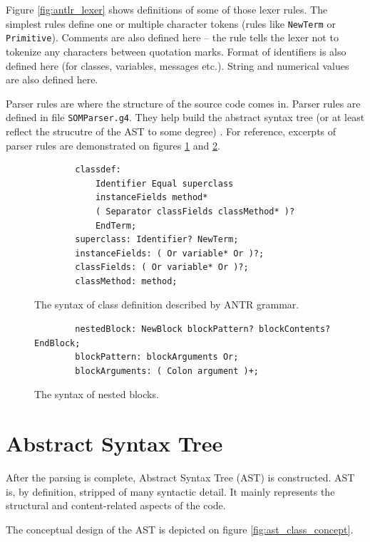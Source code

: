 \documentclass[thesis=M,english]{FITthesis}[2019/12/23]
\begin{document}
Figure \ref{fig:antlr_lexer} shows definitions of some of those lexer rules. The simplest rules define one or multiple character
tokens (rules like \texttt{NewTerm} or \texttt{Primitive}). Comments are also defined here -- the rule tells the lexer not to tokenize
any characters between quotation marks. Format of identifiers is also defined here (for classes, variables, messages etc.). String
and numerical values are also defined here.

Parser rules are where the structure of the source code comes in. Parser rules are defined in file \texttt{SOMParser.g4}. They
help build the abstract syntax tree (or at least reflect the strucutre of the AST to some degree) \cite{antlr-basics}. For reference, excerpts of
parser rules are demonstrated on figures \ref{fig:antlr_classdef} and \ref{fig:antlr_blocks}.

\begin{figure}[h!]
	\centering
	\begin{verbatim}
		classdef:
		    Identifier Equal superclass
		    instanceFields method*
		    ( Separator classFields classMethod* )?
		    EndTerm;
		superclass: Identifier? NewTerm;
		instanceFields: ( Or variable* Or )?;
		classFields: ( Or variable* Or )?;
		classMethod: method;
	\end{verbatim}
	\caption{The syntax of class definition described by ANTR grammar.}
	\label{fig:antlr_classdef}
\end{figure}

\begin{figure}
	\centering
	\begin{verbatim}
		nestedBlock: NewBlock blockPattern? blockContents? EndBlock;
		blockPattern: blockArguments Or;
		blockArguments: ( Colon argument )+;
	\end{verbatim}
	\caption{The syntax of nested blocks.}
	\label{fig:antlr_blocks}
\end{figure}


\section{Abstract Syntax Tree}
After the parsing is complete, Abstract Syntax Tree (AST) is constructed. AST is, by definition, stripped of many syntactic detail.
It mainly represents the structural and content-related aspects of the code.

The conceptual design of the AST is depicted on figure \ref{fig:ast_class_concept}.
\end{document}
